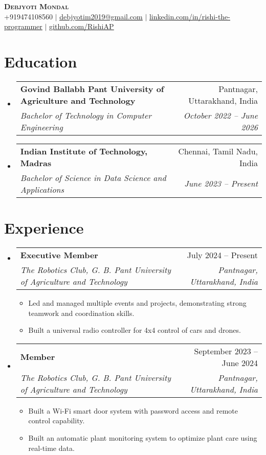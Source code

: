 \documentclass[letterpaper,11pt]{article}
\makeatletter
\newcommand{\resumeItem}[1]{
  \item\small{
    {#1 \vspace{-2pt}}
  }
}
\newcommand{\resumeSubheading}[4]{
  \vspace{-2pt}\item
    \begin{tabular*}{0.97\textwidth}[t]{l@{\extracolsep{\fill}}r}
      \textbf{#1} & #2 \\
      \textit{\small#3} & \textit{\small #4} \\
    \end{tabular*}\vspace{-7pt}
}
\newcommand{\resumeSubSubheading}[2]{
    \item
    \begin{tabular*}{0.97\textwidth}{l@{\extracolsep{\fill}}r}
      \textit{\small#1} & \textit{\small #2} \\
    \end{tabular*}\vspace{-7pt}
}
\newcommand{\resumeSubHeadingListStart}{\begin{itemize}[leftmargin=0.15in, label={}]}
\newcommand{\resumeSubHeadingListEnd}{\end{itemize}}
\newcommand{\resumeItemListStart}{\begin{itemize}}
\newcommand{\resumeItemListEnd}{\end{itemize}\vspace{-5pt}}
\makeatother
\begin{document}

\begin{center}
    \textbf{\Huge \scshape Debjyoti Mondal} \\ \vspace{1pt}
    \small +919474108560 $|$ \href{mailto:debjyotim2019@gmail.com}{\underline{debjyotim2019@gmail.com}} $|$ 
    \href{https://linkedin.com/in/rishi-the-programmer}{\underline{linkedin.com/in/rishi-the-programmer}} $|$
    \href{https://github.com/RishiAP}{\underline{github.com/RishiAP}}
\end{center}


\section{Education}
  \resumeSubHeadingListStart
    \resumeSubheading
      {Govind Ballabh Pant University of Agriculture and Technology}{Pantnagar, Uttarakhand, India}
      {Bachelor of Technology in Computer Engineering}{October 2022 -- June 2026}
    \resumeSubheading
      {Indian Institute of Technology, Madras}{Chennai, Tamil Nadu, India}
      {Bachelor of Science in Data Science and Applications}{June 2023 -- Present}
  \resumeSubHeadingListEnd


\section{Experience}
  \resumeSubHeadingListStart

    \resumeSubheading
      {Executive Member}{July 2024 -- Present}
      {The Robotics Club, G. B. Pant University of Agriculture and Technology}{Pantnagar, Uttarakhand, India}
      \resumeItemListStart
      \resumeItem{Led and managed multiple events and projects, demonstrating strong teamwork and coordination skills.}
      \resumeItem{Built a universal radio controller for 4x4 control of cars and drones.}
      \resumeItemListEnd
      

    \resumeSubheading
      {Member}{September 2023 -- June 2024}
      {The Robotics Club, G. B. Pant University of Agriculture and Technology}{Pantnagar, Uttarakhand, India}
      \resumeItemListStart
        \resumeItem{Built a Wi-Fi smart door system with password access and remote control capability.}
        \resumeItem{Built an automatic plant monitoring system to
        optimize plant care using real-time data.}
      \resumeItemListEnd
  \resumeSubHeadingListEnd
\end{document}

